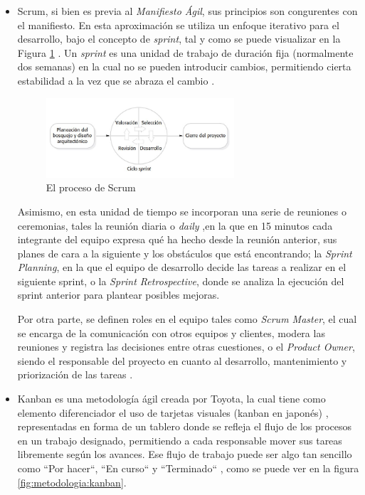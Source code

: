     \begin{itemize}
        \item Scrum, si bien es previa al \textit{Manifiesto Ágil}, sus principios son congurentes con el manifiesto. En esta aproximación se utiliza un enfoque iterativo para el desarrollo, bajo el concepto de \textit{sprint}, tal y como se puede visualizar en la Figura \ref{fig:metodologia:scrum} . Un \textit{sprint} es una unidad de trabajo de duración fija (normalmente dos semanas) en la cual no se pueden introducir cambios, permitiendo cierta estabilidad a la vez que se abraza el cambio \cite{pressman_software_2005}. 

        \begin{figure}[h]
            \centering
            \includegraphics[width=0.66\textwidth]{figures/scrum.JPG}
            \caption[El proceso de Scrum, extraído de \cite{sommerville_software_2011}]{El proceso de Scrum}
            \label{fig:metodologia:scrum}
        \end{figure}
        
        Asimismo, en esta unidad de tiempo se incorporan una serie de reuniones o ceremonias, tales la reunión diaria o \textit{daily} ,en la que en 15 minutos cada integrante del equipo expresa qué ha hecho desde la reunión anterior, sus planes de cara a la siguiente y los obstáculos que está encontrando; la \textit{Sprint Planning}, en la que el equipo de desarrollo decide las tareas a realizar en el siguiente sprint, o la \textit{Sprint Retrospective}, donde se analiza la ejecución del sprint anterior para plantear posibles mejoras. 

        Por otra parte, se definen roles en el equipo tales como \textit{Scrum Master}, el cual se encarga de la comunicación con otros equipos y clientes, modera las reuniones y registra las decisiones entre otras cuestiones, o el \textit{Product Owner}, siendo el responsable del proyecto en cuanto al desarrollo, mantenimiento y priorización de las tareas \cite{valtx_metodologias_2023}.

        \item Kanban es una metodología ágil creada por Toyota, la cual tiene como elemento diferenciador el uso de tarjetas visuales (kanban en japonés) \cite{pzt_metodologias_nodate}, representadas en forma de un tablero donde se refleja el flujo de los procesos en un trabajo designado, permitiendo a cada responsable mover sus tareas libremente según los avances. Ese flujo de trabajo puede ser algo tan sencillo como ``Por hacer``, ``En curso`` y ``Terminado`` \cite{atlassian_que_nodate-1}, como se puede ver en la figura \ref{fig:metodologia:kanban}.


\end{itemize}
